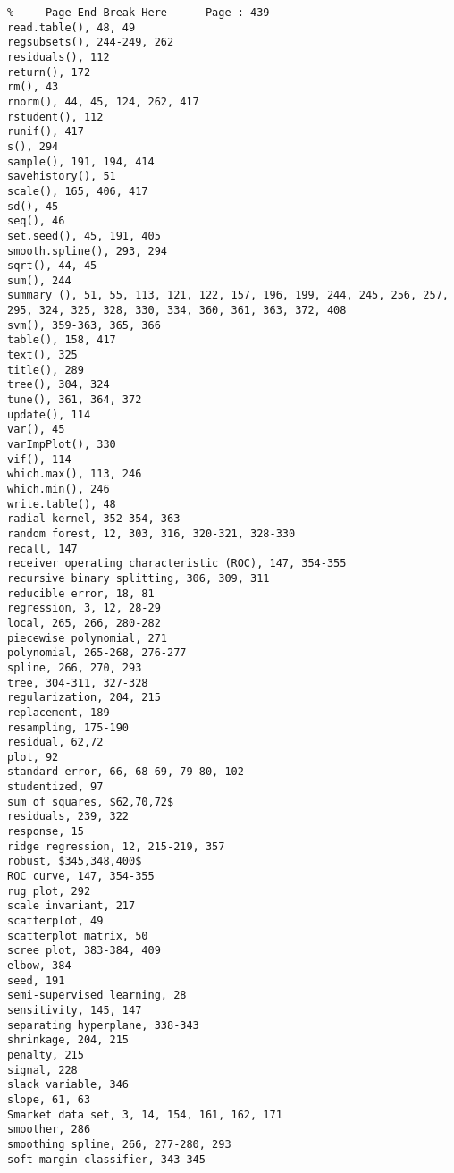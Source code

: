 \documentclass[10pt]{article}
\begin{document}
\begin{verbatim}
%---- Page End Break Here ---- Page : 439
read.table(), 48, 49
regsubsets(), 244-249, 262
residuals(), 112
return(), 172
rm(), 43
rnorm(), 44, 45, 124, 262, 417
rstudent(), 112
runif(), 417
s(), 294
sample(), 191, 194, 414
savehistory(), 51
scale(), 165, 406, 417
sd(), 45
seq(), 46
set.seed(), 45, 191, 405
smooth.spline(), 293, 294
sqrt(), 44, 45
sum(), 244
summary (), 51, 55, 113, 121, 122, 157, 196, 199, 244, 245, 256, 257, 295, 324, 325, 328, 330, 334, 360, 361, 363, 372, 408
svm(), 359-363, 365, 366
table(), 158, 417
text(), 325
title(), 289
tree(), 304, 324
tune(), 361, 364, 372
update(), 114
var(), 45
varImpPlot(), 330
vif(), 114
which.max(), 113, 246
which.min(), 246
write.table(), 48
radial kernel, 352-354, 363
random forest, 12, 303, 316, 320-321, 328-330
recall, 147
receiver operating characteristic (ROC), 147, 354-355
recursive binary splitting, 306, 309, 311
reducible error, 18, 81
regression, 3, 12, 28-29
local, 265, 266, 280-282
piecewise polynomial, 271
polynomial, 265-268, 276-277
spline, 266, 270, 293
tree, 304-311, 327-328
regularization, 204, 215
replacement, 189
resampling, 175-190
residual, 62,72
plot, 92
standard error, 66, 68-69, 79-80, 102
studentized, 97
sum of squares, $62,70,72$
residuals, 239, 322
response, 15
ridge regression, 12, 215-219, 357
robust, $345,348,400$
ROC curve, 147, 354-355
rug plot, 292
scale invariant, 217
scatterplot, 49
scatterplot matrix, 50
scree plot, 383-384, 409
elbow, 384
seed, 191
semi-supervised learning, 28
sensitivity, 145, 147
separating hyperplane, 338-343
shrinkage, 204, 215
penalty, 215
signal, 228
slack variable, 346
slope, 61, 63
Smarket data set, 3, 14, 154, 161, 162, 171
smoother, 286
smoothing spline, 266, 277-280, 293
soft margin classifier, 343-345


\end{verbatim}
\end{document}

